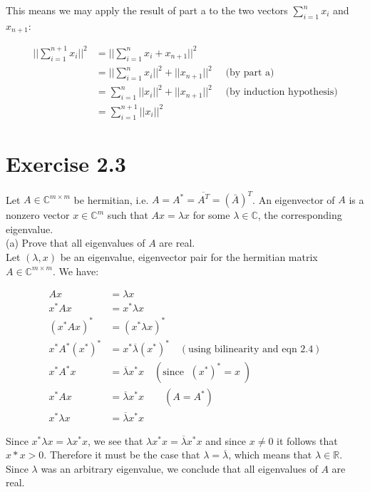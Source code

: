 \documentclass[11pt]{article}
\begin{document}
This means we may apply the result of part a to the two vectors $\sum_{i=1}^n x_i$ and $x_{n+1}$:

\begin{align*}
||\sum_{i=1}^{n+1} x_i ||^2 &= ||\sum_{i=1}^n x_i + x_{n+1}||^2\\
&= ||\sum_{i=1}^n x_i||^2 + ||x_{n+1}||^2 \quad \text{ (by part a)}\\
&= \sum_{i=1}^n ||x_i||^2 + ||x_{n+1}||^2 \quad \text{ (by induction hypothesis)}\\
&= \sum_{i=1}^{n+1} ||x_i||^2
\end{align*}

\section*{Exercise 2.3}

Let $A \in \mathbb{C}^{m\times m}$ be hermitian, i.e. $A = A^* = \overline{A^T} = (\bar{A})^T$. An eigenvector of $A$ is a nonzero vector $x \in \mathbb{C}^{m}$ such that $Ax  = \lambda x$ for some $\lambda \in \mathbb{C}$, the corresponding eigenvalue. \\

(a) Prove that all eigenvalues of $A$ are real. \\

Let $(\lambda, x)$ be an eigenvalue, eigenvector pair for the hermitian matrix $A \in \mathbb{C}^{m\times m}$. We have:

\begin{align*}
Ax &= \lambda x\\
x^*Ax &= x^*\lambda x\\
(x^*Ax)^* &= (x^*\lambda x)^*\\
x^*A^*(x^*)^* &= x^*\overline{\lambda}(x^*)^* \quad (\text{using bilinearity and eqn 2.4})\\
x^*A^*x &= \overline{\lambda}x^*x\quad (\text{since }\;(x^*)^* = x\;) \\
x^*Ax &= \overline{\lambda}x^*x \quad \quad (A = A^*)\\
x^*\lambda x &= \overline{\lambda}x^*x
\end{align*}


Since $x^*\lambda x = \lambda x^* x$, we see that $\lambda x^*x = \overline{\lambda}x^*x$ and since $x \neq 0$ it follows that $x*x >0$. Therefore it must be the case that $\lambda = \overline{\lambda}$, which means that $\lambda \in \mathbb{R}$. Since $\lambda$ was an arbitrary eigenvalue, we conclude that all eigenvalues of $A$ are real. \\
\end{document}
